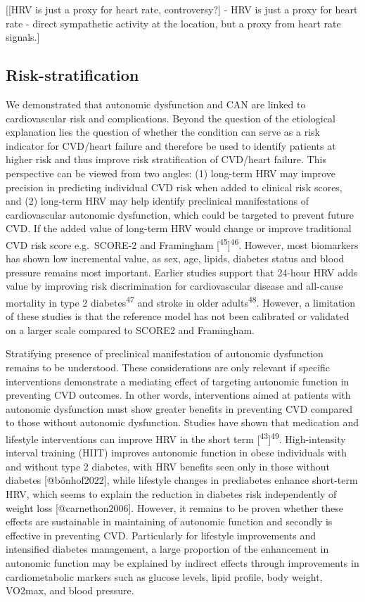 \documentclass[
  a4paper,
  headsepline=true,
  open=any]{scrbook}
\begin{document}
{[}{[}HRV is just a proxy for heart rate, controversy?{]} - HRV is just
a proxy for heart rate - direct sympathetic activity at the location,
but a proxy from heart rate signals.{]}

\hypertarget{risk-stratification-1}{%
\subsection{Risk-stratification}\label{risk-stratification-1}}

We demonstrated that autonomic dysfunction and CAN are linked to
cardiovascular risk and complications. Beyond the question of the
etiological explanation lies the question of whether the condition can
serve as a risk indicator for CVD/heart failure and therefore be used to
identify patients at higher risk and thus improve risk stratification of
CVD/heart failure. This perspective can be viewed from two angles: (1)
long-term HRV may improve precision in predicting individual CVD risk
when added to clinical risk scores, and (2) long-term HRV may help
identify preclinical manifestations of cardiovascular autonomic
dysfunction, which could be targeted to prevent future CVD. If the added
value of long-term HRV would change or improve traditional CVD risk
score e.g.~SCORE-2 and Framingham
{[}\textsuperscript{45}{]}\textsuperscript{46}. However, most biomarkers
has shown low incremental value, as sex, age, lipids, diabetes status
and blood pressure remains most important. Earlier studies support that
24-hour HRV adds value by improving risk discrimination for
cardiovascular disease and all-cause mortality in type 2
diabetes\textsuperscript{47} and stroke in older
adults\textsuperscript{48}. However, a limitation of these studies is
that the reference model has not been calibrated or validated on a
larger scale compared to SCORE2 and Framingham.

Stratifying presence of preclinical manifestation of autonomic
dysfunction remains to be understood. These considerations are only
relevant if specific interventions demonstrate a mediating effect of
targeting autonomic function in preventing CVD outcomes. In other words,
interventions aimed at patients with autonomic dysfunction must show
greater benefits in preventing CVD compared to those without autonomic
dysfunction. Studies have shown that medication and lifestyle
interventions can improve HRV in the short term
{[}\textsuperscript{43}{]}\textsuperscript{49}. High-intensity interval
training (HIIT) improves autonomic function in obese individuals with
and without type 2 diabetes, with HRV benefits seen only in those
without diabetes {[}@bönhof2022{]}, while lifestyle changes in
prediabetes enhance short-term HRV, which seems to explain the reduction
in diabetes risk independently of weight loss {[}@carnethon2006{]}.
However, it remains to be proven whether these effects are sustainable
in maintaining of autonomic function and secondly is effective in
preventing CVD. Particularly for lifestyle improvements and intensified
diabetes management, a large proportion of the enhancement in autonomic
function may be explained by indirect effects through improvements in
cardiometabolic markers such as glucose levels, lipid profile, body
weight, VO2max, and blood pressure.
\end{document}
